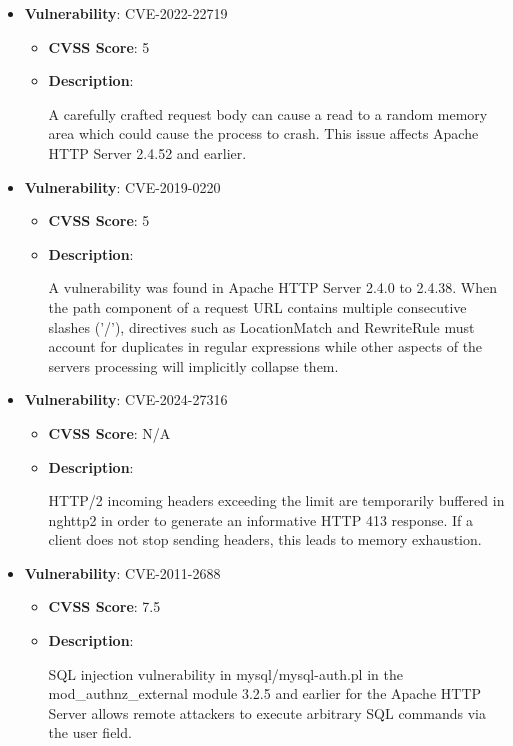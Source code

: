 \documentclass{article}
\begin{document}
\begin{itemize}
        \item \textbf{Vulnerability}: CVE-2022-22719
        \begin{itemize}
            \item \textbf{CVSS Score}:  5 
            \item \textbf{Description}:
            \parbox[t]{0.9\linewidth}{
                \ttfamily A carefully crafted request body can cause a read to a random memory area which could cause the process to crash. This issue affects Apache HTTP Server 2.4.52 and earlier.
            }
        \end{itemize}
    
        \item \textbf{Vulnerability}: CVE-2019-0220
        \begin{itemize}
            \item \textbf{CVSS Score}:  5 
            \item \textbf{Description}:
            \parbox[t]{0.9\linewidth}{
                \ttfamily A vulnerability was found in Apache HTTP Server 2.4.0 to 2.4.38. When the path component of a request URL contains multiple consecutive slashes ('/'), directives such as LocationMatch and RewriteRule must account for duplicates in regular expressions while other aspects of the servers processing will implicitly collapse them.
            }
        \end{itemize}
    
        \item \textbf{Vulnerability}: CVE-2024-27316
        \begin{itemize}
            \item \textbf{CVSS Score}:  N/A 
            \item \textbf{Description}:
            \parbox[t]{0.9\linewidth}{
                \ttfamily HTTP/2 incoming headers exceeding the limit are temporarily buffered in nghttp2 in order to generate an informative HTTP 413 response. If a client does not stop sending headers, this leads to memory exhaustion.
            }
        \end{itemize}
    
        \item \textbf{Vulnerability}: CVE-2011-2688
        \begin{itemize}
            \item \textbf{CVSS Score}:  7.5 
            \item \textbf{Description}:
            \parbox[t]{0.9\linewidth}{
                \ttfamily SQL injection vulnerability in mysql/mysql-auth.pl in the mod\_authnz\_external module 3.2.5 and earlier for the Apache HTTP Server allows remote attackers to execute arbitrary SQL commands via the user field.
            }
        \end{itemize}
    

\end{itemize}
\end{document}

